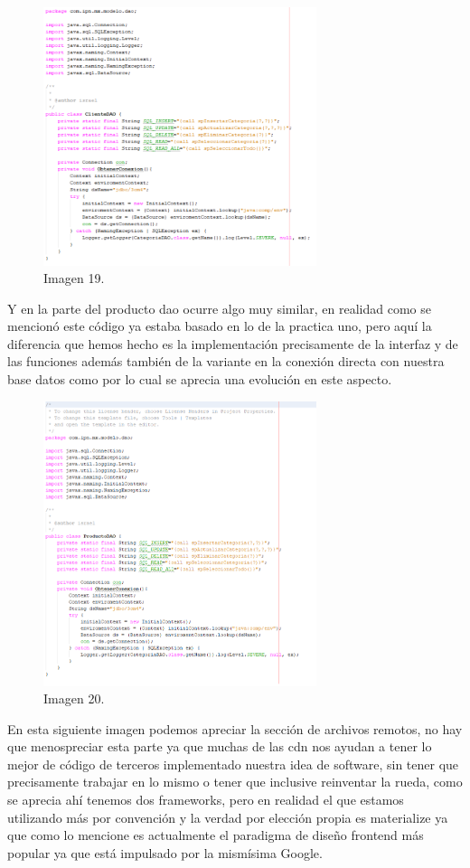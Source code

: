 \documentclass[10pt,a4paper]{article}
\begin{document}
\begin{figure}[h]
\centering
\includegraphics[width=8cm]{clienteDao}
\caption{Imagen 19.}
\label{fig:figure1}
\end{figure}

Y en la parte del producto dao ocurre algo muy similar, en realidad como se mencionó este código ya estaba basado en lo de la practica uno, pero aquí la diferencia que hemos hecho es la implementación precisamente de la interfaz y de las funciones además también de la variante en la conexión directa con nuestra base datos como por lo cual se aprecia una evolución en este aspecto.
\begin{figure}[h]
\centering
\includegraphics[width=8cm]{productoDao}
\caption{Imagen 20.}
\label{fig:figure1}
\end{figure}

\vspace{60mm}

En esta siguiente imagen podemos apreciar la sección de archivos remotos, no hay que menospreciar esta parte ya que muchas de las cdn nos ayudan a tener lo mejor de código de terceros implementado nuestra idea de software, sin tener que precisamente trabajar en lo mismo o tener que inclusive reinventar la rueda, como se aprecia ahí tenemos dos frameworks, pero en realidad el que estamos utilizando más por convención y la verdad por elección propia es materialize ya que como lo mencione es actualmente el paradigma de diseño frontend más popular ya que está impulsado por la mismísima Google.
\end{document}
